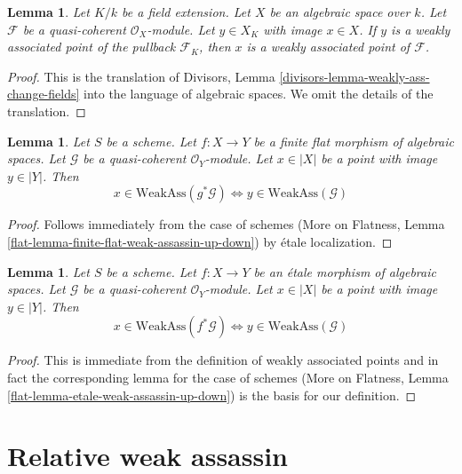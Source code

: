 \documentclass{stacks-project}
\theoremstyle{plain}
\newtheorem{lemma}[subsection]{Lemma}
\theoremstyle{definition}
\theoremstyle{remark}
\numberwithin{equation}{subsection}
\begin{document}
\begin{lemma}
\label{lemma-weakly-ass-change-fields}
Let $K/k$ be a field extension. Let $X$ be an algebraic space over $k$.
Let $\mathcal{F}$ be a quasi-coherent $\mathcal{O}_X$-module.
Let $y \in X_K$ with image $x \in X$. If $y$ is a weakly
associated point of the pullback $\mathcal{F}_K$, then $x$
is a weakly associated point of $\mathcal{F}$.
\end{lemma}

\begin{proof}
This is the translation of
Divisors, Lemma \ref{divisors-lemma-weakly-ass-change-fields}
into the language of algebraic spaces. We omit the details of the
translation.
\end{proof}

\begin{lemma}
\label{lemma-finite-flat-weak-assassin-up-down}
Let $S$ be a scheme.
Let $f : X \to Y$ be a finite flat morphism of algebraic spaces.
Let $\mathcal{G}$ be a quasi-coherent $\mathcal{O}_Y$-module.
Let $x \in |X|$ be a point with image $y \in |Y|$. Then
$$
x \in \text{WeakAss}(g^*\mathcal{G})
\Leftrightarrow
y \in \text{WeakAss}(\mathcal{G})
$$
\end{lemma}

\begin{proof}
Follows immediately from the case of schemes
(More on Flatness, Lemma \ref{flat-lemma-finite-flat-weak-assassin-up-down})
by \'etale localization.
\end{proof}

\begin{lemma}
\label{lemma-etale-weak-assassin-up-down}
Let $S$ be a scheme.
Let $f : X \to Y$ be an \'etale morphism of algebraic spaces.
Let $\mathcal{G}$ be a quasi-coherent $\mathcal{O}_Y$-module.
Let $x \in |X|$ be a point with image $y \in |Y|$. Then
$$
x \in \text{WeakAss}(f^*\mathcal{G})
\Leftrightarrow
y \in \text{WeakAss}(\mathcal{G})
$$
\end{lemma}

\begin{proof}
This is immediate from the definition of weakly associated points
and in fact the corresponding lemma for the case of schemes
(More on Flatness, Lemma \ref{flat-lemma-etale-weak-assassin-up-down})
is the basis for our definition.
\end{proof}







\section{Relative weak assassin}
\label{section-relative-weak-assassin}
\end{document}
